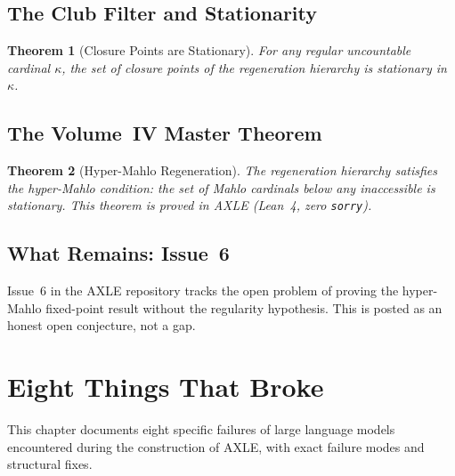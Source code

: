 \documentclass[11pt, twoside, openright]{book}
\theoremstyle{plain}
\newtheorem{theorem}{Theorem}[chapter]
\theoremstyle{definition}
\begin{document}
\section{The Club Filter and Stationarity}

\begin{theorem}[Closure Points are Stationary]
For any regular uncountable cardinal $\kappa$, the set of closure points
of the regeneration hierarchy is stationary in $\kappa$.
\end{theorem}

\section{The Volume~IV Master Theorem}

\begin{theorem}[Hyper-Mahlo Regeneration]
The regeneration hierarchy satisfies the hyper-Mahlo condition: the
set of Mahlo cardinals below any inaccessible is stationary.
This theorem is proved in AXLE (Lean~4, zero \texttt{sorry}).
\end{theorem}

\section{What Remains: Issue~6}

Issue~6 in the AXLE repository tracks the open problem of proving the
hyper-Mahlo fixed-point result without the regularity hypothesis.
This is posted as an honest open conjecture, not a gap.

\chapter{Eight Things That Broke}

This chapter documents eight specific failures of large language models
encountered during the construction of AXLE, with exact failure modes
and structural fixes.
\end{document}
